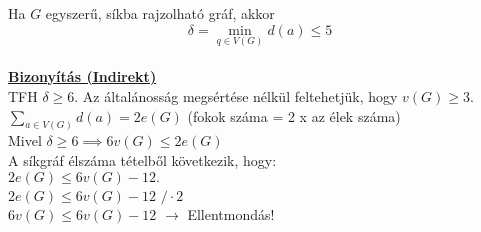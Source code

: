 \begin{frame}
\begin{tcolorbox}[title={Tétel: Minimális fokszáma síkgráfban.}]
Ha $G$ egyszerű, síkba rajzolható gráf, akkor $$\delta = \min_{{q \in V(G)}} d(a) \leq 5$$\\
\tcblower
\msmallskip
\underline{\textbf{Bizonyítás (Indirekt)}}\\
\mmedskip
TFH $\delta \geq 6$.
Az általánosság megsértése nélkül feltehetjük, hogy $v(G) \geq 3$.\\
$\sum_{{a \in V(G)}} d(a) = 2e(G)$ (fokok száma = 2 x az élek száma)\\
Mivel $\delta \geq 6 \implies 6v(G) \leq 2e(G)$\\
A síkgráf élszáma tételből következik, hogy:\\
$2e(G) \leq 6v(G) - 12.$\\
\mbigskip
$2e(G) \leq 6v(G) - 12$ \hspace{1ex} $/\cdot2$\\
$6v(G) \leq 6v(G) - 12$ $\rightarrow$ Ellentmondás!
\end{tcolorbox}
\end{frame}

